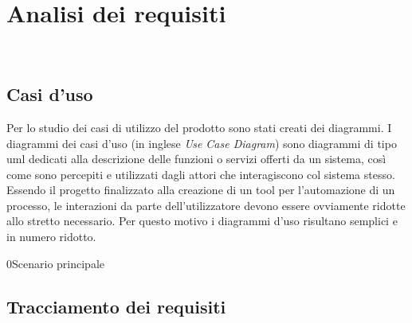 \chapter{Analisi dei requisiti}
\label{cap:analisi-requisiti}

\\

\section{Casi d'uso}

Per lo studio dei casi di utilizzo del prodotto sono stati creati dei diagrammi.
I diagrammi dei casi d'uso (in inglese \emph{Use Case Diagram}) sono diagrammi di tipo \gls{uml} dedicati alla descrizione delle funzioni o servizi offerti da un sistema, così come sono percepiti e utilizzati dagli attori che interagiscono col sistema stesso.
Essendo il progetto finalizzato alla creazione di un tool per l'automazione di un processo, le interazioni da parte dell'utilizzatore devono essere ovviamente ridotte allo stretto necessario. Per questo motivo i diagrammi d'uso risultano semplici e in numero ridotto.


\begin{usecase}{0}{Scenario principale}
\label{uc:scenario-principale}
\end{usecase}

\section{Tracciamento dei requisiti}

